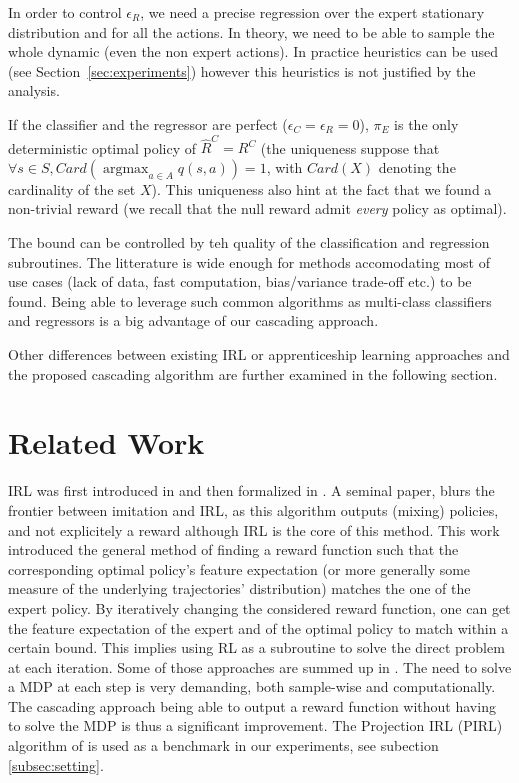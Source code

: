 \documentclass[smallextended]{svjour3}
\newcommand{\argmax}{\operatorname*{argmax}} %
\begin{document}
In order to control $\epsilon_R$, we need a precise regression over the expert stationary distribution and for all the actions. In theory, we need to be able to sample the whole dynamic (even the non expert actions). In practice heuristics can be used (see Section~\ref{sec:experiments}) however this heuristics is not justified by the analysis.

If the classifier and the regressor are perfect ($\epsilon_C=\epsilon_R=0$), $\pi_E$ is the only deterministic optimal policy of $\hat{R}^C=R^C$ (the uniqueness suppose that $\forall s\in S, Card(\argmax_{a\in A}q(s,a))=1$, with $Card(X)$ denoting the cardinality of the set $X$). This uniqueness also hint at the fact that we found a non-trivial reward (we recall that the null reward admit \emph{every} policy as optimal).

The bound can be controlled by teh quality of the classification and regression subroutines. The litterature is wide enough for methods accomodating most of use cases (lack of data, fast computation, bias/variance trade-off etc.) to be found. Being able to leverage such common algorithms as multi-class classifiers and regressors is a big advantage of our cascading approach.

Other differences between existing IRL or apprenticeship learning approaches and the proposed cascading algorithm are further examined in the following section.

\section{Related Work}
\label{sec:related}
IRL was first introduced in \cite{russell1998learning} and then formalized in \cite{ng2000algorithms}. A seminal paper, \cite{abbeel2004apprenticeship} blurs the frontier between imitation and IRL, as this algorithm outputs (mixing) policies, and not explicitely a reward although IRL is the core of this method. This work introduced the general method of finding a reward function such that the corresponding optimal policy's feature expectation (or
more generally some measure of the underlying trajectories'
distribution) matches the one of the expert policy. By iteratively changing the considered reward function, one can get the feature expectation of the expert and of the optimal policy to match within a certain bound. This implies using RL as a subroutine to solve the direct problem at each iteration. Some of those approaches are summed up in \cite{neu2009training}. The need to solve a MDP at each step is very demanding, both sample-wise and computationally. The cascading approach being able to output a reward function without having to solve the MDP is thus a significant improvement.
The Projection IRL (PIRL) algorithm of \cite{abbeel2004apprenticeship} is used as a benchmark in our experiments, see subection \ref{subsec:setting}. 
\end{document}
